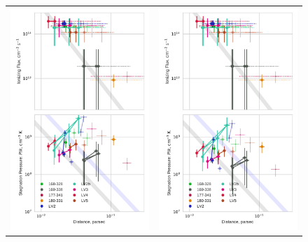 \begin{figure}
  \centering
  \begin{tabular}{cc}
    \includegraphics[width=0.5\linewidth]{./Figures/plot-wind-fits}& \includegraphics[width=0.5\linewidth]{./Figures/plot-wind-fits-2}  
  \end{tabular}

\end{figure}
